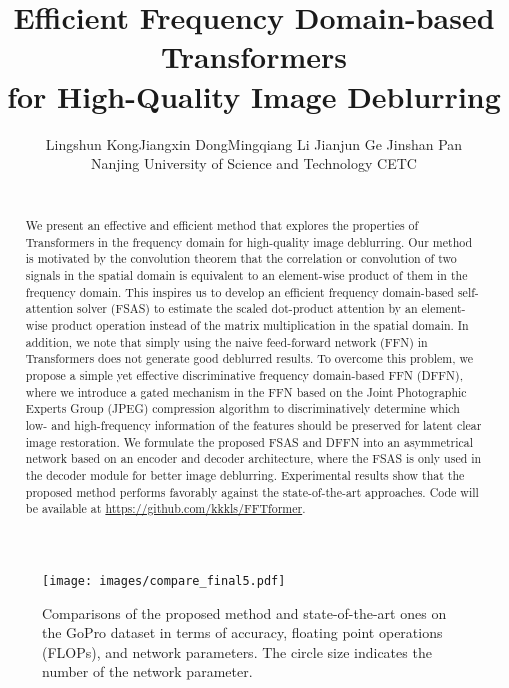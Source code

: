 \documentclass[10pt,twocolumn,letterpaper]{article}
\begin{document}
\title{Efficient Frequency Domain-based Transformers \\for High-Quality Image Deblurring}

\author{Lingshun Kong\quad Jiangxin Dong\quad Mingqiang Li \quad Jianjun Ge \quad Jinshan Pan \\
Nanjing University of Science and Technology \quad CETC\\
\\
}
\maketitle

\begin{abstract}
We present an effective and efficient method that explores the properties of Transformers in the frequency domain for high-quality image deblurring.
Our method is motivated by the convolution theorem that the correlation or convolution of two signals in the spatial domain is equivalent to an element-wise product of them in the frequency domain.
This inspires us to develop an efficient frequency domain-based self-attention solver (FSAS) to estimate the scaled dot-product attention by an element-wise product operation instead of the matrix multiplication in the spatial domain.
In addition, we note that simply using the naive feed-forward network (FFN) in Transformers does not generate good deblurred results. To overcome this problem, we propose a simple yet effective discriminative frequency domain-based FFN (DFFN), where we introduce a gated mechanism in the FFN based on the Joint Photographic Experts Group (JPEG) compression algorithm to discriminatively determine which low- and high-frequency information of the features should be preserved for latent clear image restoration.
We formulate the proposed FSAS and DFFN into an asymmetrical network based on an encoder and decoder architecture, where the FSAS is only used in the decoder module for better image deblurring.
Experimental results show that the proposed method performs favorably against the state-of-the-art approaches. Code will be available at \url{https://github.com/kkkls/FFTformer}.


\end{abstract}


\begin{figure}[!t]
    \centering
    \vspace{0mm}
 \texttt{[image: images/compare\_final5.pdf]}
 \vspace{-6mm}
 \caption{Comparisons of the proposed method and state-of-the-art ones on the GoPro dataset \cite{GoPro} in terms of accuracy, floating point operations (FLOPs), and network parameters. The circle size indicates the number of the network parameter. }
 \label{fig:Params}
 \vspace{-5mm}
\end{figure}
\end{document}
